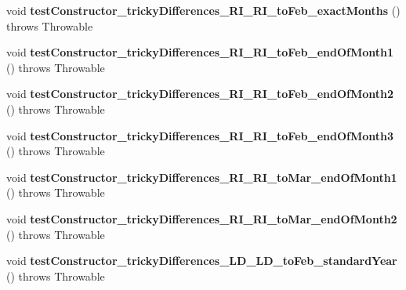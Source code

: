 \begin{DoxyCompactItemize}
\item 
\hypertarget{classorg_1_1joda_1_1time_1_1_test_period___constructors_af2a49ee81727cc293b7a737ae797833f}{void {\bfseries test\-Constructor\-\_\-tricky\-Differences\-\_\-\-R\-I\-\_\-\-R\-I\-\_\-to\-Feb\-\_\-exact\-Months} ()  throws Throwable }\label{classorg_1_1joda_1_1time_1_1_test_period___constructors_af2a49ee81727cc293b7a737ae797833f}

\item 
\hypertarget{classorg_1_1joda_1_1time_1_1_test_period___constructors_a077fa2645128ec5d5cc626b297ac2b95}{void {\bfseries test\-Constructor\-\_\-tricky\-Differences\-\_\-\-R\-I\-\_\-\-R\-I\-\_\-to\-Feb\-\_\-end\-Of\-Month1} ()  throws Throwable }\label{classorg_1_1joda_1_1time_1_1_test_period___constructors_a077fa2645128ec5d5cc626b297ac2b95}

\item 
\hypertarget{classorg_1_1joda_1_1time_1_1_test_period___constructors_a68437b76acd24208b941696ced079ee0}{void {\bfseries test\-Constructor\-\_\-tricky\-Differences\-\_\-\-R\-I\-\_\-\-R\-I\-\_\-to\-Feb\-\_\-end\-Of\-Month2} ()  throws Throwable }\label{classorg_1_1joda_1_1time_1_1_test_period___constructors_a68437b76acd24208b941696ced079ee0}

\item 
\hypertarget{classorg_1_1joda_1_1time_1_1_test_period___constructors_a7f21d88f7018a53b57d78864f04422e0}{void {\bfseries test\-Constructor\-\_\-tricky\-Differences\-\_\-\-R\-I\-\_\-\-R\-I\-\_\-to\-Feb\-\_\-end\-Of\-Month3} ()  throws Throwable }\label{classorg_1_1joda_1_1time_1_1_test_period___constructors_a7f21d88f7018a53b57d78864f04422e0}

\item 
\hypertarget{classorg_1_1joda_1_1time_1_1_test_period___constructors_aee251e7062772193bf74b432d9f29629}{void {\bfseries test\-Constructor\-\_\-tricky\-Differences\-\_\-\-R\-I\-\_\-\-R\-I\-\_\-to\-Mar\-\_\-end\-Of\-Month1} ()  throws Throwable }\label{classorg_1_1joda_1_1time_1_1_test_period___constructors_aee251e7062772193bf74b432d9f29629}

\item 
\hypertarget{classorg_1_1joda_1_1time_1_1_test_period___constructors_ad1e610d9306cc779d74db24abb9e50f2}{void {\bfseries test\-Constructor\-\_\-tricky\-Differences\-\_\-\-R\-I\-\_\-\-R\-I\-\_\-to\-Mar\-\_\-end\-Of\-Month2} ()  throws Throwable }\label{classorg_1_1joda_1_1time_1_1_test_period___constructors_ad1e610d9306cc779d74db24abb9e50f2}

\item 
\hypertarget{classorg_1_1joda_1_1time_1_1_test_period___constructors_a3d682ee293cb314d49c8d112e3ba90c7}{void {\bfseries test\-Constructor\-\_\-tricky\-Differences\-\_\-\-L\-D\-\_\-\-L\-D\-\_\-to\-Feb\-\_\-standard\-Year} ()  throws Throwable }\label{classorg_1_1joda_1_1time_1_1_test_period___constructors_a3d682ee293cb314d49c8d112e3ba90c7}


\end{DoxyCompactItemize}
